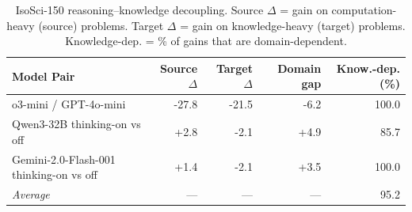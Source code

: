\begin{table}[t]
\centering
\caption{IsoSci-150 reasoning–knowledge decoupling. Source $\Delta$ = gain on computation-heavy (source) problems. Target $\Delta$ = gain on knowledge-heavy (target) problems. Knowledge-dep. = \% of gains that are domain-dependent.}
\label{tab:isosci_decoupling}
\begin{tabular}{lrrrr}
\toprule
\textbf{Model Pair} & \textbf{Source $\Delta$} & \textbf{Target $\Delta$} & \textbf{Domain gap} & \textbf{Know.-dep. (\%)} \\
\midrule
o3-mini / GPT-4o-mini & -27.8 & -21.5 & -6.2 & 100.0 \\
Qwen3-32B thinking-on vs off & +2.8 & -2.1 & +4.9 & 85.7 \\
Gemini-2.0-Flash-001 thinking-on vs off & +1.4 & -2.1 & +3.5 & 100.0 \\
\midrule
\textit{Average} & — & — & — & 95.2 \\
\bottomrule
\end{tabular}
\end{table}